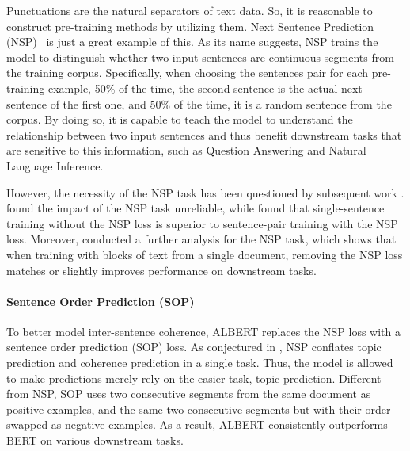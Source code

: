 \documentclass[fleqn]{SCYE-arxiv}
\begin{document}
\begin{multicols}{2}
Punctuations are the natural separators of text data. So, it is reasonable to construct pre-training methods by utilizing them. Next Sentence Prediction (NSP)~\cite{devlin2019bert} is just a great example of this. As its name suggests, NSP trains the model to distinguish whether two input sentences are continuous segments from the training corpus. Specifically, when choosing the sentences pair for each pre-training example, 50\% of the time, the second sentence is the actual next sentence of the first one, and 50\% of the time, it is a random sentence from the corpus. By doing so, it is capable to teach the model to understand the relationship between two input sentences and thus benefit downstream tasks that are sensitive to this information, such as Question Answering and Natural Language Inference.


However, the necessity of the NSP task has been questioned by subsequent work \cite{joshi2019spanbert,yang2019xlnet,liu2019roberta,lan2019albert}. \citet{yang2019xlnet} found the impact of the NSP task unreliable, while \citet{joshi2019spanbert} found that single-sentence training without the NSP loss is superior to sentence-pair training with the NSP loss. Moreover, \citet{liu2019roberta} conducted a further analysis for the NSP task, which shows that when training with blocks of text from a single document, removing the NSP loss matches or slightly improves performance on downstream tasks.

\paragraph{Sentence Order Prediction (SOP)}

To better model inter-sentence coherence, ALBERT \cite{lan2019albert} replaces the NSP loss with a sentence order prediction (SOP) loss.
As conjectured in \citet{lan2019albert}, NSP conflates topic prediction and coherence prediction in a single task. Thus, the model is allowed to make predictions merely rely on the easier task, topic prediction.
Different from NSP, SOP uses two consecutive segments from the same document as positive examples, and the same two consecutive segments but with their order swapped as negative examples.
As a result, ALBERT consistently outperforms BERT on various downstream tasks.


\end{multicols}
\end{document}
